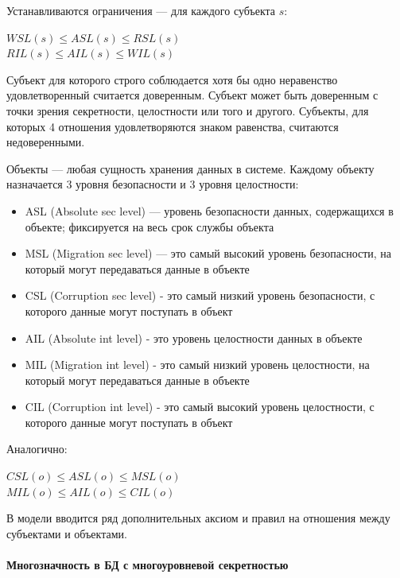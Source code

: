 Устанавливаются ограничения --- для каждого субъекта $s$:

\begin{center}
$WSL(s) \leqslant ASL(s) \leq RSL(s)$ \\
$RIL(s) \leqslant AIL(s) \leq WIL(s)$
\end{center}

Субъект для которого строго соблюдается хотя бы одно неравенство удовлетворенный считается доверенным. Субъект может
быть доверенным с точки зрения секретности, целостности или того и другого. Субъекты, для которых 4 отношения
удовлетворяются знаком равенства, считаются недоверенными.

Объекты --- любая сущность хранения данных в системе. Каждому объекту назначается 3 уровня безопасности и
3 уровня целостности:
\begin{itemize}
    \item ASL (Absolute sec level) --- уровень безопасности данных, содержащихся в объекте; фиксируется на весь срок
    службы объекта
    \item MSL (Migration sec level) --- это самый высокий уровень безопасности, на который могут передаваться данные
    в объекте
    \item CSL (Corruption sec level) - это самый низкий уровень безопасности, с которого данные могут поступать в объект
    \item AIL (Absolute int level) - это уровень целостности данных в объекте
    \item MIL (Migration int level) - это самый низкий уровень целостности, на который могут передаваться данные в объекте
    \item CIL (Corruption int level) - это самый высокий уровень целостности, с которого данные могут поступать в объект
\end{itemize}

Аналогично:

\begin{center}
$CSL(o) \leqslant ASL(o) \leq MSL(o)$ \\
$MIL(o) \leqslant AIL(o) \leq CIL(o)$
\end{center}

В модели вводится ряд дополнительных аксиом и правил на отношения между субъектами и объектами.

\paragraph{Многозначность в БД с многоуровневой секретностью}


